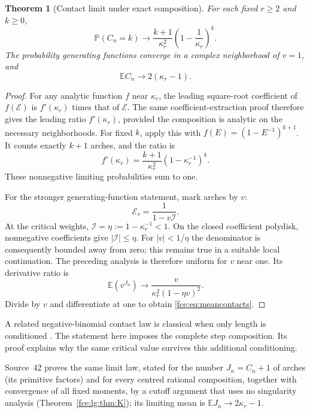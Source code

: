 \documentclass[11pt,a4paper]{article}
\numberwithin{equation}{section}
\newtheorem{theorem}{Theorem}[section]
\theoremstyle{definition}\newtheorem{definition}[theorem]{Definition}
\theoremstyle{remark}\newtheorem{remark}[theorem]{Remark}
\newcommand{\E}{\mathcal E}
\newcommand{\Prob}{\mathbb P}
\newcommand{\Exp}{\mathbb E}
\begin{document}
\begin{theorem}[Contact limit under exact composition]\label{fce:thm:contacts}
For each fixed $r\ge2$ and $k\ge0$,
\begin{equation}\label{fce:eq:contactlaw}
 \Prob(C_n=k)\longrightarrow
 \frac{k+1}{\kappa_r^2}\left(1-\frac1{\kappa_r}\right)^k.
\end{equation}
The probability generating functions converge in a complex neighborhood
of $v=1$, and
\begin{equation}\label{fce:eq:meancontacts}
 \Exp C_n\longrightarrow 2(\kappa_r-1).
\end{equation}
\end{theorem}
\begin{proof}
For any analytic function $f$ near $\kappa_r$, the leading square-root
coefficient of $f(\E)$ is $f'(\kappa_r)$ times that of $\E$. The same
coefficient-extraction proof therefore gives the leading ratio
$f'(\kappa_r)$, provided the composition is analytic on the necessary
neighborhoods. For fixed $k$, apply this with
$f(E)=(1-E^{-1})^{k+1}$. It counts exactly $k+1$ arches, and the ratio is
\[
 f'(\kappa_r)=\frac{k+1}{\kappa_r^2}
                    (1-\kappa_r^{-1})^k.
\]
These nonnegative limiting probabilities sum to one.

For the stronger generating-function statement, mark arches by $v$:
\[
 \E_v=\frac{1}{1-v\mathcal I}.
\]
At the critical weights, $\mathcal I=\eta:=1-\kappa_r^{-1}<1$. On the closed
coefficient polydisk, nonnegative coefficients give $|\mathcal I|\le\eta$.
For $|v|<1/\eta$ the denominator is consequently bounded away from zero;
this remains true in a suitable local continuation. The preceding
analysis is therefore uniform for $v$ near one. Its derivative ratio is
\[
 \Exp(v^{J_n})\longrightarrow
 \frac{v}{\kappa_r^2(1-\eta v)^2}.
\]
Divide by $v$ and differentiate at one to obtain \eqref{fce:eq:meancontacts}.
\end{proof}
A related negative-binomial contact law is classical when only length is
conditioned \cite{bf}. The statement here imposes the complete step
composition. Its proof explains why the same critical value survives this
additional conditioning.

Source~42 proves the same limit law, stated for the number $J_n=C_n+1$ of
arches (its primitive factors) and for every centred rational
composition, together with convergence of all fixed moments, by a cutoff
argument that uses no singularity analysis
(Theorem~\ref{fce:lg:thm:K}); its limiting mean is
$\Exp J_n\to2\kappa_r-1$.
\end{document}
